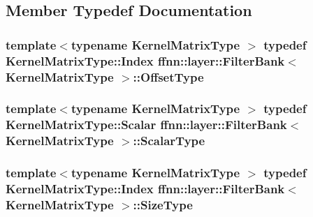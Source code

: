 \subsection{Member Typedef Documentation}
\hypertarget{classffnn_1_1layer_1_1_filter_bank_a87d15738c0864b171f2b605af7330432}{
\subsubsection[{Offset\-Type}]{\setlength{\rightskip}{0pt plus 5cm}template$<$typename Kernel\-Matrix\-Type $>$ typedef Kernel\-Matrix\-Type\-::\-Index {\bf ffnn\-::layer\-::\-Filter\-Bank}$<$ Kernel\-Matrix\-Type $>$\-::{\bf Offset\-Type}}}\label{classffnn_1_1layer_1_1_filter_bank_a87d15738c0864b171f2b605af7330432}
\hypertarget{classffnn_1_1layer_1_1_filter_bank_a9520eb8417c9c124f33c1136d40842d4}{
\subsubsection[{Scalar\-Type}]{\setlength{\rightskip}{0pt plus 5cm}template$<$typename Kernel\-Matrix\-Type $>$ typedef Kernel\-Matrix\-Type\-::\-Scalar {\bf ffnn\-::layer\-::\-Filter\-Bank}$<$ Kernel\-Matrix\-Type $>$\-::{\bf Scalar\-Type}}}\label{classffnn_1_1layer_1_1_filter_bank_a9520eb8417c9c124f33c1136d40842d4}
\hypertarget{classffnn_1_1layer_1_1_filter_bank_afd78272ebca97ce2f34596ffb9dc6cd9}{
\subsubsection[{Size\-Type}]{\setlength{\rightskip}{0pt plus 5cm}template$<$typename Kernel\-Matrix\-Type $>$ typedef Kernel\-Matrix\-Type\-::\-Index {\bf ffnn\-::layer\-::\-Filter\-Bank}$<$ Kernel\-Matrix\-Type $>$\-::{\bf Size\-Type}}}\label{classffnn_1_1layer_1_1_filter_bank_afd78272ebca97ce2f34596ffb9dc6cd9}


